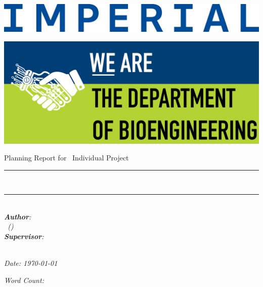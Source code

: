 \begin{titlepage}
\Large

\begin{minipage}{0.4\textwidth}
    \includegraphics[width=\textwidth]{figures/IMPERIAL_Wordmark_CMYK_Blue_2024.eps}
\end{minipage}
\hfill
\begin{minipage}{0.4\textwidth}
\begin{flushright}
    \includegraphics[width=.9\textwidth]{figures/Bioeng.png}
\end{flushright}
\end{minipage}

\vspace{1.5cm}

\begin{center}
    {\huge Planning Report for \degree \ Individual Project} \\ [1cm]
    \rule{\textwidth}{.1cm} \\[0.4cm]
    {\Huge \reporttitle}
    \rule{\textwidth}{.1cm} \\ [1.5cm]

    \textit{\textbf{Author}: \\ \reportauthor \ (\cid)} \\ [1cm]
    \textit{\textbf{Supervisor}: \\ \reportsupervisor} \\ [1cm]

    \vfill
    
    \begin{minipage}{0.5\textwidth}
    \centering
        \textit{Date: \today} \\ [1cm]
    \end{minipage}
    \hfill
    \begin{minipage}{0.4\textwidth}
    \centering
        \textit{Word Count: \wordcount} \\ [1cm]
    \end{minipage}
\end{center}

\end{titlepage}